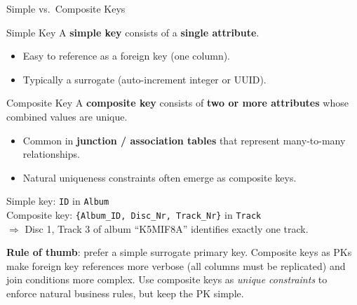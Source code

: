 \begin{frame}{Simple vs.\ Composite Keys}
  \begin{block}{Simple Key}
    A \textbf{simple key} consists of a \textbf{single attribute}.
    \begin{itemize}
      \item Easy to reference as a foreign key (one column).
      \item Typically a surrogate (auto-increment integer or UUID).
    \end{itemize}
  \end{block}

  \begin{block}{Composite Key}
    A \textbf{composite key} consists of \textbf{two or more attributes}
    whose combined values are unique.
    \begin{itemize}
      \item Common in \textbf{junction / association tables} that
            represent many-to-many relationships.
      \item Natural uniqueness constraints often emerge as composite keys.
    \end{itemize}
  \end{block}

  \begin{examples}{}
    Simple key: \texttt{ID} in \texttt{Album}\\[4pt]
    Composite key: \texttt{\{Album\_ID, Disc\_Nr, Track\_Nr\}} in \texttt{Track}\\
    $\Rightarrow$ Disc 1, Track 3 of album ``K5MIF8A'' identifies exactly one track.
  \end{examples}

  \textbf{Rule of thumb}: prefer a simple surrogate primary key.
  Composite keys as PKs make foreign key references more verbose (all
  columns must be replicated) and join conditions more complex.
  Use composite keys as \emph{unique constraints} to enforce natural
  business rules, but keep the PK simple.
\end{frame}

